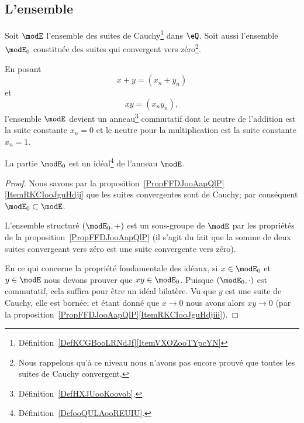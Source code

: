 \subsection{L'ensemble}

Soit \( \modE\) l'ensemble des suites de Cauchy\footnote{Définition~\ref{DefKCGBooLRNdJf}\ref{ItemVXOZooTYpcYN}} dans \( \eQ\). Soit aussi l'ensemble \( \modE_0\) constituée des suites qui convergent vers zéro\footnote{Nous rappelons qu'à ce niveau nous n'avons pas encore prouvé que toutes les suites de Cauchy convergent.}.

En posant
\begin{equation}
	x+y=(x_n+y_n)
\end{equation}
et
\begin{equation}
	xy=(x_ny_n),
\end{equation}
l'ensemble \( \modE\) devient un anneau\footnote{Définition~\ref{DefHXJUooKoovob}.} commutatif dont le neutre de l'addition est la suite constante \( x_n=0\) et le neutre pour la multiplication est la suite constante \( x_n=1\).

\begin{proposition}     \label{PROPooNUQVooAAkicK}
	La partie \( \modE_0\) est un idéal\footnote{Définition~\ref{DefooQULAooREUIU}.} de l'anneau \( \modE\).
\end{proposition}

\begin{proof}
	Nous savons par la proposition~\ref{PropFFDJooAapQlP}\ref{ItemRKCIooJguHdji} que les suites convergentes sont de Cauchy; par conséquent \( \modE_0\subset\modE\).

	L'ensemble structuré \( (\modE_0,+)\) est un sous-groupe de \( \modE\) par les propriétés de la proposition~\ref{PropFFDJooAapQlP} (il s'agit du fait que la somme de deux suites convergeant vers zéro est une suite convergente vers zéro).

	En ce qui concerne la propriété fondamentale des idéaux, si \( x\in\modE_0\) et \( y\in\modE\) nous devons prouver que \( xy\in \modE_0\). Puisque \( (\modE_0,\cdot)\) est commutatif, cela suffira pour être un idéal bilatère. Vu que \( y\) est une suite de Cauchy, elle est bornée; et étant donné que \( x\to 0\) nous avons alors \( xy\to 0\) (par la proposition~\ref{PropFFDJooAapQlP}\ref{ItemRKCIooJguHdjiii}).
\end{proof}


